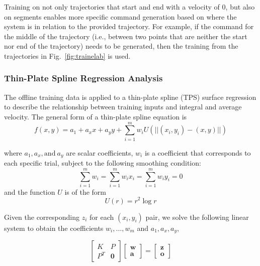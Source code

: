 \documentclass[letterpaper, 10 pt, conference]{ieeeconf}  %
\newcommand\NB[1]{$\spadesuit$\footnote{NB: #1}}
\begin{document}
Training on not only trajectories that start and end with a velocity of $0$, but also on segments enables more specific command generation based on where the system is in relation to the provided trajectory. For example, if the command for the middle of the trajectory (i.e., between two points that are neither the start nor end of the trajectory) needs to be generated, then the training from the trajectories in Fig.~\ref{fig:trainelab} is used.


\subsubsection{Thin-Plate Spline Regression Analysis}

The offline training data is applied to a thin-plate spline (TPS) surface regression to describe the relationship between training inputs and integral and average velocity. The general form of a thin-plate spline equation is 
\begin{equation}
    f(x,y) = a_1 + a_xx + a_yy + \sum_{i=1}^mw_iU(||(x_i,y_i)-(x,y)||)
\end{equation}

where $a_1,a_x,\text{and}~a_y$ are scalar coefficients, $w_i$ is a coefficient that corresponds to each specific trial, subject to the following smoothing condition: \begin{equation}
\sum_{i=1}^mw_i=\sum_{i=1}^mw_ix_i=\sum_{i=1}^mw_iy_i=0
\end{equation}
and the function $U$ is of the form
\begin{equation}
  U(r) = r^2\log{r} 
\end{equation}

Given the corresponding $z_i$ for each $(x_i,y_i)$ pair, we solve the following linear system to obtain the coefficients $w_i,\ldots,w_m$ and $a_1,a_x,a_y$,

\begin{equation}
    \begin{bmatrix}
    K&P\\
    P^T& \mathbf{0}
    \end{bmatrix}
    \begin{bmatrix}
    \mathbf{w}\\
    \mathbf{a}
    \end{bmatrix} = 
    \begin{bmatrix}
    \mathbf{z}\\
    \mathbf{o}
    \end{bmatrix}
\end{equation}
\end{document}
